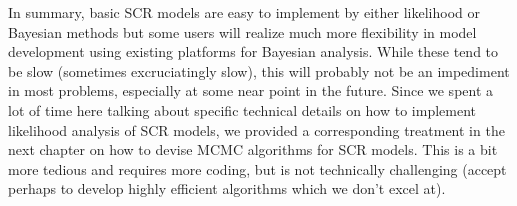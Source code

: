 In summary, basic SCR models are easy to implement by either
likelihood or Bayesian methods but some users will 
realize much more flexibility in model development using existing
platforms for Bayesian analysis. While these tend to be slow
(sometimes excruciatingly slow), this will probably not be an
impediment in most problems, especially at some near point in the
future.  Since we spent a lot of time here talking about specific
technical details on how to implement likelihood analysis of SCR
models, we provided a corresponding treatment in the next chapter on
how to devise MCMC algorithms for SCR models. This is a bit more
tedious and requires more coding, but is not technically challenging
(accept perhaps to develop highly efficient algorithms which we don’t
excel at).



